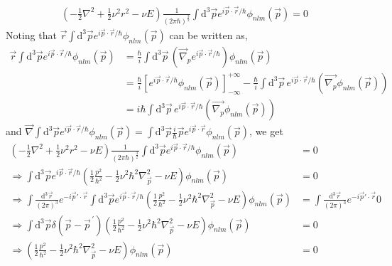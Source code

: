 \documentclass[10pt]{article}
\begin{document}
\begin{align*}
\left( -\frac{1}{2} \nabla^{2} + \frac{1}{2} \nu^{2} r^{2} - \nu E  \right) \frac{1}{(2\pi \hbar)^{\frac{3}{2}}} \int \textrm{d}^{3} \vec{p} e^{i \vec{p} \cdot \vec{r} / \hbar} \phi_{n l m}(\vec{p}) = 0
\end{align*}
Noting that $\vec{r} \int \textrm{d}^{3} \vec{p} e^{i \vec{p} \cdot \vec{r} / 
\hbar} \phi_{n l m}(\vec{p})$ can be written as,
\begin{align*}
\vec{r} \int \textrm{d}^{3} \vec{p} e^{i \vec{p} \cdot \vec{r}/ \hbar} \phi_{n 
l m}(\vec{p}) &= \frac{\hbar}{i} \int \text{d}^{3} \vec{p} \, \left( 
\vec{\nabla}_{p} e^{i \vec{p} \cdot \vec{r}/ \hbar} \right) \phi_{n l 
m}(\vec{p}) \\
	&= \frac{\hbar}{i} \left[ e^{i \vec{p} \cdot \vec{r}/ \hbar } \phi_{ n l m}(\vec{p}) \right]^{+\infty}_{-\infty} - \frac{\hbar}{i}\int \text{d}^{3} \vec{p} \,  e^{i \vec{p} \cdot \vec{r} / \hbar} \left( \vec{\nabla_{p}} \phi_{n l m}(\vec{p}) \right) \\
	&= i \hbar \int \text{d}^{3} \vec{p} \,  e^{i \vec{p} \cdot \vec{r} / \hbar} \left( \vec{\nabla_{p}} \phi_{n l m}(\vec{p}) \right)
\end{align*}
and $\vec{\nabla} \int \textrm{d}^{3} \vec{p} e^{i \vec{p} \cdot \vec{r}/ \hbar} 
\phi_{n l m}(\vec{p}) = \int \textrm{d}^{3} \vec{p} \frac{i}{\hbar} \vec{p} e^{i 
\vec{p} \cdot \vec{r}} \phi_{n l m}(\vec{p}) $, we get
\begin{align*}
\left( -\frac{1}{2} \nabla^{2} + \frac{1}{2} \nu^{2} r^{2} - \nu E  \right) \frac{1}{(2\pi \hbar)^{\frac{3}{2}}} \int \textrm{d}^{3} \vec{p} e^{i \vec{p} \cdot \vec{r}/ \hbar} \phi_{n l m}(\vec{p}) &= 0 \\
\Rightarrow \int \textrm{d}^{3} \vec{p} e^{i \vec{p} \cdot \vec{r}/ \hbar} \left( \frac{1}{2} \frac{p^{2}}{\hbar^{2}} - \frac{1}{2} \nu^{2} \hbar^{2} \nabla^{2}_{\vec{p}} - \nu E  \right) \phi_{n l m}(\vec{p}) &= 0 \\
\Rightarrow \int \frac{\text{d}^{3} \vec{r}}{(2\pi)^{3}} e^{-i \vec{p}' \cdot \vec{r}} \int \textrm{d}^{3} \vec{p} e^{i \vec{p} \cdot \vec{r}/ \hbar} \left( \frac{1}{2} \frac{p^{2}}{\hbar^{2}} - \frac{1}{2} \nu^{2} \hbar^{2} \nabla^{2}_{\vec{p}} - \nu E  \right) \phi_{n l m}(\vec{p}) &= \int \frac{\text{d}^{3} \vec{r}}{(2\pi)^{3}} e^{-i \vec{p}' \cdot \vec{r}} 0 \\
\Rightarrow  \int \textrm{d}^{3} \vec{p} \delta(\vec{p} - \vec{p}^{\, \prime}) \left( \frac{1}{2} \frac{p^{2}}{\hbar^{2}} - \frac{1}{2} \nu^{2} \hbar^{2} \nabla^{2}_{\vec{p}} - \nu E  \right) \phi_{n l m}(\vec{p}) &= 0 \\
\Rightarrow  \left( \frac{1}{2} \frac{p^{2}}{\hbar^{2}} - \frac{1}{2} \nu^{2} \hbar^{2} \nabla^{2}_{\vec{p}} - \nu E  \right) \phi_{n l m}(\vec{p}) &= 0
\end{align*}
\end{document}

